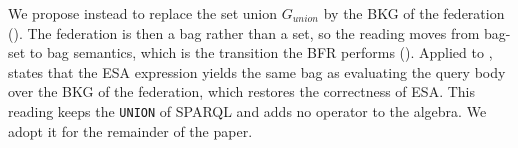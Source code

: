 We propose instead to replace the set union $G_{\mathit{union}}$ by the \ac{BKG} of the federation ().
The federation is then a bag rather than a set, so the reading moves from bag-set to bag semantics, which is the transition the \ac{BFR} performs ().
Applied to ,  states that the \ac{ESA} expression yields the same bag as evaluating the query body over the \ac{BKG} of the federation, which restores the correctness of \ac{ESA}.
This reading keeps the \texttt{UNION} of SPARQL and adds no operator to the algebra.
We adopt it for the remainder of the paper.
